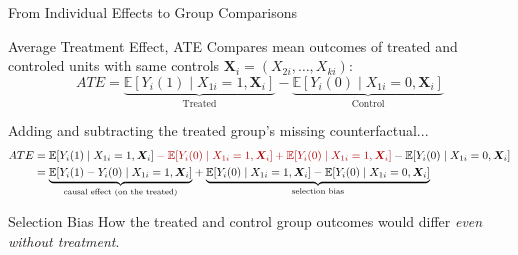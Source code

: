 \documentclass[9pt,aspectratio=169]{beamer}
\newcommand{\E}{\mathbb{E}}
\begin{document}
\begin{frame}{From Individual Effects to Group Comparisons}
\linespread{1.2}\selectfont
  \begin{block}{Average Treatment Effect, ATE}
    Compares mean outcomes of treated and controled units with same controls $\boldsymbol{X}_i = (X_{2i},\dots,X_{ki})$:
  \[
    ATE =
    \underbrace{\E[Y_i(1)\mid X_{1i}=1, \boldsymbol{X}_i]}_{\text{Treated}} - \underbrace{\E[Y_i(0)\mid X_{1i}=0, \boldsymbol{X}_i]}_{\text{Control}}
  \]
  \end{block}
  Adding and subtracting the treated group's \textcolor{red!70!black}{missing counterfactual}...
  \begin{align*}
    ATE&= \E[Y_i(1)\mid X_{1i}=1, \boldsymbol{X}_i] \textcolor{red!70!black}{{}- \E[Y_i(0)\mid X_{1i}=1, \boldsymbol{X}_i] + \E[Y_i(0)\mid X_{1i}=1, \boldsymbol{X}_i]{}}
    - \E[Y_i(0)\mid X_{1i}=0, \boldsymbol{X}_i]\\
    &= {\underbrace{\E[Y_i(1)-Y_i(0)\mid X_{1i}=1, \boldsymbol{X}_i]}_{\text{causal effect (on the treated)}}} +\underbrace{\E[Y_i(0)\mid X_{1i}=1, \boldsymbol{X}_i]-\E[Y_i(0)\mid X_{1i}=0, \boldsymbol{X}_i]}_{\text{selection bias}}
  \end{align*}
  \vspace{-0.2cm}
  \begin{block}{Selection Bias}
    How the treated and control group outcomes would differ \emph{even without treatment}.
  \end{block}
\end{frame}
\end{document}
